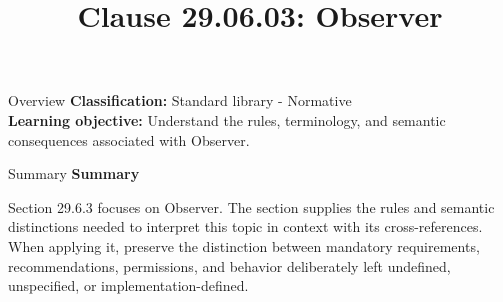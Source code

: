 \documentclass[10pt,letterpaper]{article}
\title{Clause 29.06.03: Observer}
\author{}
\date{}
\begin{document}
\maketitle
\begin{CornellOverviewBox}{Overview}
\textbf{Classification:} Standard library - Normative\\[2pt]
\textbf{Learning objective:} Understand the rules, terminology, and semantic consequences associated with Observer.
\end{CornellOverviewBox}\begin{CornellSummaryBox}{Summary}
{\sffamily\bfseries\color{Accent} Summary}\par\vspace{3pt}Section 29.6.3 focuses on Observer. The section supplies the rules and semantic distinctions needed to interpret this topic in context with its cross-references. When applying it, preserve the distinction between mandatory requirements, recommendations, permissions, and behavior deliberately left undefined, unspecified, or implementation-defined.
\end{CornellSummaryBox}
\end{document}
